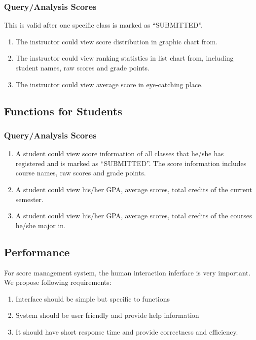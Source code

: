 \documentclass[a4]{article}
\begin{document}
\subsubsection{Query/Analysis Scores}
This is valid after one specific class is marked as ``SUBMITTED''.
\begin{enumerate}
\item The instructor could view score distribution in graphic chart from.
\item The instructor could view ranking statistics in list chart from, including student names, raw scores and grade points.
\item The instructor could view average score in eye-catching place.
\end{enumerate}
\subsection{Functions for Students}
\subsubsection{Query/Analysis Scores}

\begin{enumerate}
\item A student could view score information of all classes that he/she has registered and is marked as ``SUBMITTED''. The score information includes course names, raw scores and grade points.
\item A student could view his/her GPA, average scores, total credits of the current semester.
\item A student could view his/her GPA, average scores, total credits of the courses he/she major in. 

\end{enumerate}

\subsection{Performance}

For score management system, the human interaction inferface is very important. We propose following requirements:
\begin{enumerate}
\item Interface should be simple but specific to functions
\item System should be user friendly and provide help information
\item It should have short response time and provide correctness and efficiency.
\end{enumerate}
\end{document}
